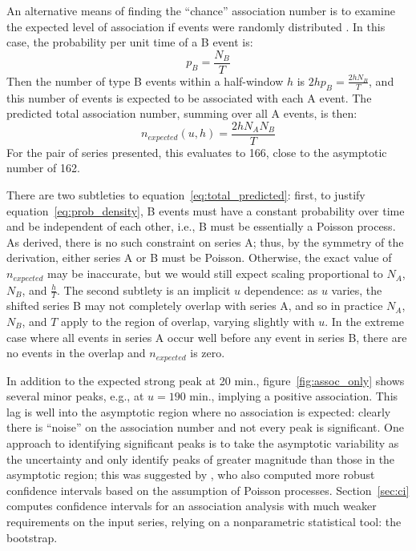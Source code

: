 \documentclass[letterpaper,11pt]{article}
\begin{document}
An alternative means of finding the ``chance'' association number is
to examine the expected level of association if events were randomly
distributed \citep[cf.][]{brillinger76}. In this case, the probability
per unit time of a B event is:
\begin{equation}
\label{eq:prob_density}
p_B = \frac{N_B}{T}
\end{equation}
Then the number of type B events within a half-window $h$ is $2 h p_B
= \frac{2 h N_B}{T}$, and this number of events is expected to be
associated with each A event. The predicted total association number,
summing over all A events, is then:
\begin{equation}
\label{eq:total_predicted}
n_{expected}(u, h) = \frac{2 h N_A N_B}{T}
\end{equation}
For the pair of series presented, this evaluates to 166, close to the
asymptotic number of 162.

There are two subtleties to equation~\ref{eq:total_predicted}: first,
to justify equation~\ref{eq:prob_density}, B events must have a
constant probability over time and be independent of each other,
i.e., B must be essentially a Poisson process. As derived, there is no
such constraint on series A; thus, by the symmetry of the derivation,
either series A or B must be Poisson. Otherwise, the exact value of
$n_{expected}$ may be inaccurate, but we would still expect scaling
proportional to $N_A$, $N_B$, and $\frac{h}{T}$. The second subtlety
is an implicit $u$ dependence: as $u$ varies, the shifted series B may
not completely overlap with series A, and so in practice $N_A$, $N_B$,
and $T$ apply to the region of overlap, varying slightly with $u$. In
the extreme case where all events in series A occur well before any
event in series B, there are no events in the overlap and
$n_{expected}$ is zero.

In addition to the expected strong peak at 20 min.,
figure~\ref{fig:assoc_only} shows several minor peaks, e.g., at $u = 190$
min., implying a positive association. This lag is well into the
asymptotic region where no association is expected: clearly there is
``noise'' on the association number and not every peak is
significant. One approach to identifying significant peaks is to take
the asymptotic variability as the uncertainty and only identify peaks
of greater magnitude than those in the asymptotic region; this was
suggested by \citet{brillinger76}, who also computed more robust confidence
intervals based on the assumption of Poisson
processes. Section~\ref{sec:ci} computes confidence intervals for an
association analysis with much weaker requirements on the input
series, relying on a nonparametric statistical tool: the bootstrap.
\end{document}
